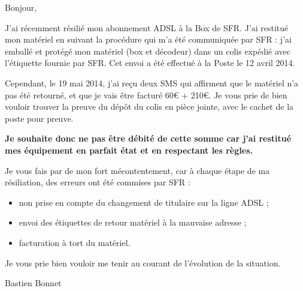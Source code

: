 \documentclass[a4paper,11pt]{article}
\begin{document}


Bonjour,

J'ai récemment résilié mon abonnement ADSL à la Box de SFR. J'ai restitué mon matériel en suivant la procédure qui m'a été communiquée par SFR : j'ai emballé et protégé mon matériel (box et décodeur) dans un colis expédié avec l'étiquette fournie par SFR. Cet envoi a été effectué à la Poste le 12 avril 2014.

Cependant, le 19 mai 2014, j'ai reçu deux SMS qui affirment que le matériel n'a pas été retourné, et que je vais être facturé 60\euro{} + 210\euro{}. Je vous prie de bien vouloir trouver la preuve du dépôt du colis en pièce jointe, avec le cachet de la poste pour preuve.

\textbf{Je souhaite donc ne pas être débité de cette somme car j'ai restitué mes équipement en parfait état et en respectant les règles.}

Je vous fais par de mon fort mécontentement, car à chaque étape de ma résiliation, des erreurs ont été commises par SFR :
\begin{itemize}
 \item non prise en compte du changement de titulaire sur la ligne ADSL ;
 \item envoi des étiquettes de retour matériel à la mauvaise adresse ;
 \item facturation à tort du matériel.
\end{itemize}

Je vous prie bien vouloir me tenir au courant de l'évolution de la situation.

\bigskip

Bastien Bonnet
\end{document}
